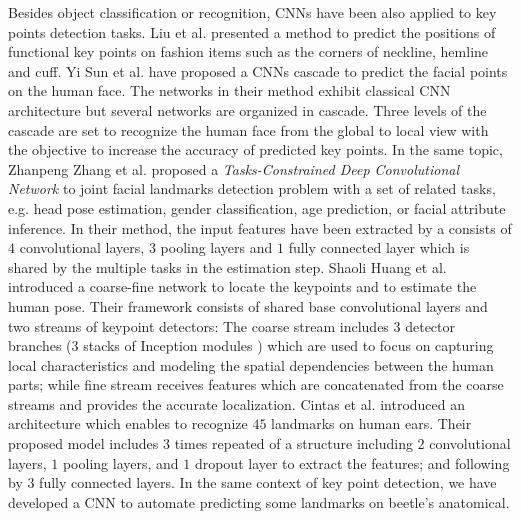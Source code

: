 \documentclass[review]{elsarticle}
\begin{document}
Besides object classification or recognition, CNNs have been also applied to key points detection tasks. Liu et al. \cite{liu2016fashion} presented a method to predict the positions of functional key points on fashion items such as the corners of neckline, hemline and cuff. Yi Sun et al. \cite{sun2013deep} have proposed a CNNs cascade to predict the facial points on the human face. The networks in their method exhibit classical CNN architecture but several networks are organized in cascade. Three levels of the cascade are set to recognize the human face from the global to local view with the objective to increase the accuracy of predicted key points. In the same topic, Zhanpeng Zhang et al. \cite{zhang2014facial} proposed a \textit{Tasks-Constrained Deep Convolutional Network} to joint facial landmarks detection problem with a set of related tasks, e.g. head pose estimation, gender classification, age prediction, or facial attribute inference. In their method, the input features have been extracted by a consists of $4$ convolutional layers, $3$ pooling layers and $1$ fully connected layer which is shared by the multiple tasks in the estimation step. Shaoli Huang et al. \cite{huang2017coarse} introduced a coarse-fine network to locate the keypoints and to estimate the human pose. Their framework consists of shared base convolutional layers and two streams of keypoint detectors: The coarse stream includes $3$ detector branches (3 stacks of Inception modules \cite{szegedy2015going}) which are used to focus on capturing local characteristics and modeling the spatial dependencies between the human parts; while fine stream receives features which are concatenated from the coarse streams and provides the accurate localization. Cintas et al. \cite{cintas2016automatic} introduced an architecture which enables to recognize $45$ landmarks on human ears. Their proposed model includes 3 times repeated of a structure including $2$ convolutional layers, $1$ pooling layers, and $1$ dropout layer to extract the features; and following by 3 fully connected layers. In the same context of key point detection, we have developed a CNN to automate predicting some landmarks on beetle's anatomical.
\end{document}
